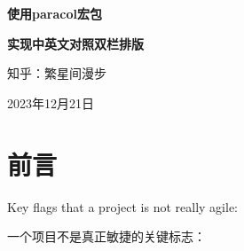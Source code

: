 \documentclass[oneside]{book}
\begin{document}
\begin{titlepage}%
    \quad
    \vspace{4ex}

    \noindent\Huge\quad\textbf{使用paracol宏包}

    \noindent\quad\textbf{实现中英文对照双栏排版}\normalsize

    \vfill

    知乎：繁星间漫步

    2023年12月21日
\end{titlepage}


\frontmatter%
\chapter{前言}


\tableofcontents%


\mainmatter
\begin{paracol}{2}
    \begin{leftcolumn}
        Key flags that a project is not really agile:
    \end{leftcolumn}
    \begin{rightcolumn}
       一个项目不是真正敏捷的关键标志：
    \end{rightcolumn}
\end{paracol}
\end{document}
